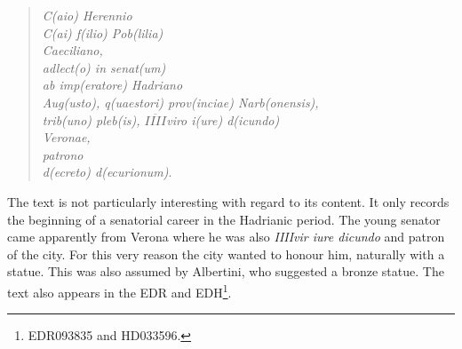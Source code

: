 \documentclass[amsthm,ebook]{saparticle}
\begin{document}
\begin{quote}
\textit{C(aio) Herennio} \\
\textit{C(ai) f(ilio) Pob(lilia)} \\
\textit{Caeciliano,} \\
\textit{adlect(o) in senat(um)} \\
\textit{ab imp(eratore) Hadriano} \\
\textit{Aug(usto), q(uaestori) prov(inciae) Narb(onensis),} \\
\textit{trib(uno) pleb(is), $\overline{IIII}$viro i(ure) d(icundo)} \\
\textit{Veronae,} \\
\textit{patrono} \\
\textit{d(ecreto) d(ecurionum)}. \\
\end{quote}


The text is not particularly interesting with regard to its content. It only records 
the beginning of a senatorial career in the Hadrianic period. The young senator 
came apparently from Verona where he was also \textit{IIIIvir iure dicundo }and 
patron of the city. For this very reason the city wanted to honour him, naturally 
with a statue. This was also assumed by Albertini, who suggested a bronze statue. 
The text also appears in the EDR and EDH\footnote{EDR093835 and HD033596.}.  
\end{document}
